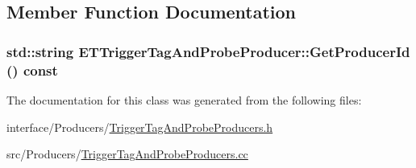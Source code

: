 \subsection{Member Function Documentation}
\hypertarget{classETTriggerTagAndProbeProducer_ae50eab132d0ef04cb8e87160ca919baa}{
\subsubsection[{GetProducerId}]{\setlength{\rightskip}{0pt plus 5cm}std::string ETTriggerTagAndProbeProducer::GetProducerId () const}}
\label{classETTriggerTagAndProbeProducer_ae50eab132d0ef04cb8e87160ca919baa}


The documentation for this class was generated from the following files:\begin{DoxyCompactItemize}
\item 
interface/Producers/\hyperlink{TriggerTagAndProbeProducers_8h}{TriggerTagAndProbeProducers.h}\item 
src/Producers/\hyperlink{TriggerTagAndProbeProducers_8cc}{TriggerTagAndProbeProducers.cc}\end{DoxyCompactItemize}

